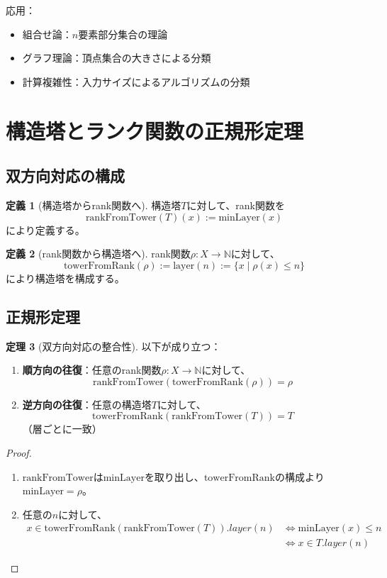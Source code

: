 \documentclass[a4paper,12pt]{ltjsarticle}
\theoremstyle{definition}
\newtheorem{definition}{定義}[section]
\newtheorem{theorem}[definition]{定理}
\begin{document}
応用：
\begin{itemize}
\item 組合せ論：$n$要素部分集合の理論
\item グラフ理論：頂点集合の大きさによる分類
\item 計算複雑性：入力サイズによるアルゴリズムの分類
\end{itemize}

\section{構造塔とランク関数の正規形定理}\label{sec:canonical}

\subsection{双方向対応の構成}

\begin{definition}[構造塔からrank関数へ]
構造塔$T$に対して、rank関数を
$$\text{rankFromTower}(T)(x) := \text{minLayer}(x)$$
により定義する。
\end{definition}

\begin{definition}[rank関数から構造塔へ]
rank関数$\rho: X \to \mathbb{N}$に対して、
$$\text{towerFromRank}(\rho) := \text{layer}(n) := \{x \mid \rho(x) \leq n\}$$
により構造塔を構成する。
\end{definition}

\subsection{正規形定理}

\begin{theorem}[双方向対応の整合性]
以下が成り立つ：
\begin{enumerate}
\item \textbf{順方向の往復}：任意のrank関数$\rho: X \to \mathbb{N}$に対して、
$$\text{rankFromTower}(\text{towerFromRank}(\rho)) = \rho$$

\item \textbf{逆方向の往復}：任意の構造塔$T$に対して、
$$\text{towerFromRank}(\text{rankFromTower}(T)) = T$$
（層ごとに一致）
\end{enumerate}
\end{theorem}

\begin{proof}
\begin{enumerate}
\item $\text{rankFromTower}$は$\text{minLayer}$を取り出し、$\text{towerFromRank}$の構成より$\text{minLayer} = \rho$。

\item 任意の$n$に対して、
\begin{align*}
x \in \text{towerFromRank}(\text{rankFromTower}(T)).layer(n)
&\iff \text{minLayer}(x) \leq n \\
&\iff x \in T.layer(n)
\end{align*}
\end{enumerate}
\end{proof}
\end{document}
